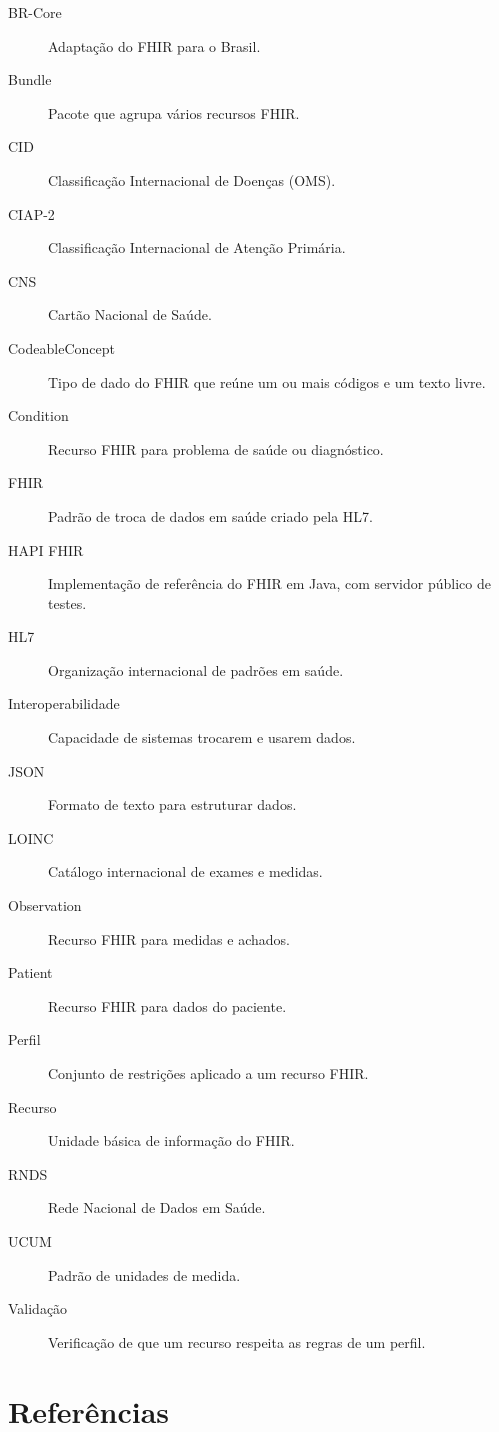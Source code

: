 \documentclass[11pt,a4paper]{article}
\begin{document}
\begin{description}
  \item[BR-Core] Adaptação do FHIR para o Brasil.
  \item[Bundle] Pacote que agrupa vários recursos FHIR.
  \item[CID] Classificação Internacional de Doenças (OMS).
  \item[CIAP-2] Classificação Internacional de Atenção Primária.
  \item[CNS] Cartão Nacional de Saúde.
  \item[CodeableConcept] Tipo de dado do FHIR que reúne um ou mais códigos
    e um texto livre.
  \item[Condition] Recurso FHIR para problema de saúde ou diagnóstico.
  \item[FHIR] Padrão de troca de dados em saúde criado pela HL7.
  \item[HAPI FHIR] Implementação de referência do FHIR em Java, com
    servidor público de testes.
  \item[HL7] Organização internacional de padrões em saúde.
  \item[Interoperabilidade] Capacidade de sistemas trocarem e usarem dados.
  \item[JSON] Formato de texto para estruturar dados.
  \item[LOINC] Catálogo internacional de exames e medidas.
  \item[Observation] Recurso FHIR para medidas e achados.
  \item[Patient] Recurso FHIR para dados do paciente.
  \item[Perfil] Conjunto de restrições aplicado a um recurso FHIR.
  \item[Recurso] Unidade básica de informação do FHIR.
  \item[RNDS] Rede Nacional de Dados em Saúde.
  \item[UCUM] Padrão de unidades de medida.
  \item[Validação] Verificação de que um recurso respeita as regras de um
    perfil.
\end{description}

\renewcommand{\sectionbreak}{}
\section*{Referências}
\end{document}

